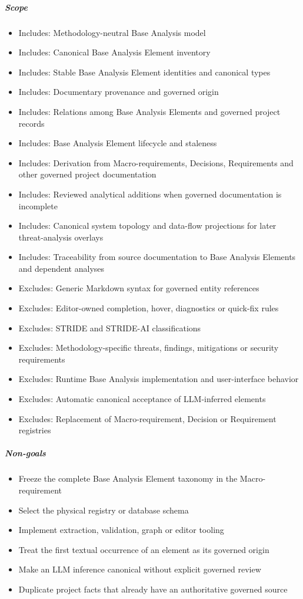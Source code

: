 \documentclass[
  10pt,
]{article}
\providecommand{\tightlist}{%
  \setlength{\itemsep}{0pt}\setlength{\parskip}{0pt}}
\begin{document}
\subparagraph{Scope}\label{scope-2}

\begin{itemize}
\tightlist
\item
  Includes: Methodology-neutral Base Analysis model
\item
  Includes: Canonical Base Analysis Element inventory
\item
  Includes: Stable Base Analysis Element identities and canonical types
\item
  Includes: Documentary provenance and governed origin
\item
  Includes: Relations among Base Analysis Elements and governed project
  records
\item
  Includes: Base Analysis Element lifecycle and staleness
\item
  Includes: Derivation from Macro-requirements, Decisions, Requirements
  and other governed project documentation
\item
  Includes: Reviewed analytical additions when governed documentation is
  incomplete
\item
  Includes: Canonical system topology and data-flow projections for
  later threat-analysis overlays
\item
  Includes: Traceability from source documentation to Base Analysis
  Elements and dependent analyses
\item
  Excludes: Generic Markdown syntax for governed entity references
\item
  Excludes: Editor-owned completion, hover, diagnostics or quick-fix
  rules
\item
  Excludes: STRIDE and STRIDE-AI classifications
\item
  Excludes: Methodology-specific threats, findings, mitigations or
  security requirements
\item
  Excludes: Runtime Base Analysis implementation and user-interface
  behavior
\item
  Excludes: Automatic canonical acceptance of LLM-inferred elements
\item
  Excludes: Replacement of Macro-requirement, Decision or Requirement
  registries
\end{itemize}

\subparagraph{Non-goals}\label{non-goals-2}

\begin{itemize}
\tightlist
\item
  Freeze the complete Base Analysis Element taxonomy in the
  Macro-requirement
\item
  Select the physical registry or database schema
\item
  Implement extraction, validation, graph or editor tooling
\item
  Treat the first textual occurrence of an element as its governed
  origin
\item
  Make an LLM inference canonical without explicit governed review
\item
  Duplicate project facts that already have an authoritative governed
  source
\end{itemize}
\end{document}
